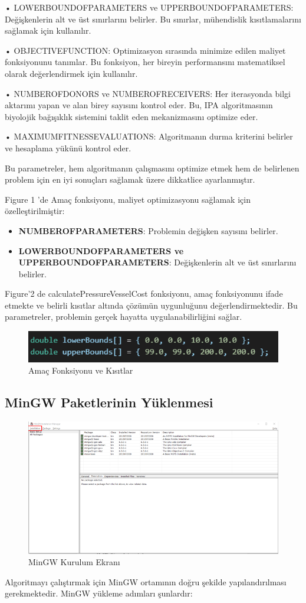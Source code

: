 \documentclass[12pt,a4paper]{article}
\begin{document}
•	LOWERBOUNDOFPARAMETERS ve UPPERBOUNDOFPARAMETERS: Değişkenlerin alt ve üst sınırlarını belirler. Bu sınırlar, mühendislik kısıtlamalarını sağlamak için kullanılır.

•	OBJECTIVEFUNCTION: Optimizasyon sırasında minimize edilen maliyet fonksiyonunu tanımlar. Bu fonksiyon, her bireyin performansını matematiksel olarak değerlendirmek için kullanılır.

•	NUMBEROFDONORS ve NUMBEROFRECEIVERS: Her iterasyonda bilgi aktarımı yapan ve alan birey sayısını kontrol eder. Bu, IPA algoritmasının biyolojik bağışıklık sistemini taklit eden mekanizmasını optimize eder.

•	MAXIMUMFITNESSEVALUATIONS: Algoritmanın durma kriterini belirler ve hesaplama yükünü kontrol eder.


Bu parametreler, hem algoritmanın çalışmasını optimize etmek hem de belirlenen problem için en iyi sonuçları sağlamak üzere dikkatlice ayarlanmıştır.

Figure 1 'de Amaç fonksiyonu, maliyet optimizasyonu sağlamak için özelleştirilmiştir:

\begin{itemize}
    \item \textbf{NUMBEROFPARAMETERS}: Problemin değişken sayısını belirler.
    \item \textbf{LOWERBOUNDOFPARAMETERS ve UPPERBOUNDOFPARAMETERS}: Değişkenlerin alt ve üst sınırlarını belirler.
\end{itemize}
Figure'2 de calculatePressureVesselCost fonksiyonu, amaç fonksiyonunu ifade etmekte ve belirli kısıtlar altında çözümün uygunluğunu değerlendirmektedir. Bu parametreler, problemin gerçek hayatta uygulanabilirliğini sağlar.
\begin{figure}[h!]
    \centering
    \includegraphics[width=0.5\linewidth]{2.png}
    \caption{Amaç Fonksiyonu ve Kısıtlar}
    \label{fig:objective}
\end{figure}

\subsection{MinGW Paketlerinin Yüklenmesi}
\begin{figure}[h!]
    \centering
    \includegraphics[width=0.5\linewidth]{3.png}
    \caption{MinGW Kurulum Ekranı}
    \label{fig:mingw}
\end{figure}
Algoritmayı çalıştırmak için MinGW ortamının doğru şekilde yapılandırılması gerekmektedir. MinGW yükleme adımları şunlardır:
\end{document}
